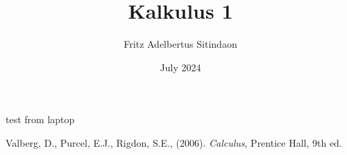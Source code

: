 \documentclass{article}
\title{Kalkulus 1}
\author{Fritz Adelbertus Sitindaon}
\date{July 2024}
\newcommand{\ds}{\displaystyle}
\begin{document}



% 
% 
% 
% 
% 

% 
% 
test from laptop

\begin{thebibliography}{9}
Valberg, D., Purcel, E.J., Rigdon, S.E., (2006). \emph{Calculus}, Prentice Hall, 9th ed.
\end{thebibliography}
\end{document}
